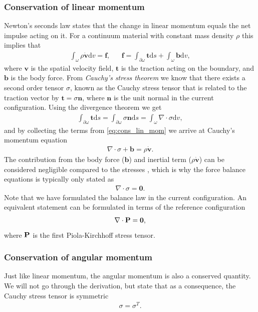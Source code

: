 \subsubsection{Conservation of linear momentum}
Newton's seconds law states that the change in linear momentum equals
the net impulse acting on it. For a continuum material with constant
mass density $\rho$ this implies that
\begin{align}
  \int_{\omega} \rho \dot{\mathbf{v}} \mathrm{d}v = \mathbf{f},
  && \mathbf{f} = \int_{\partial \omega} \mathbf{t} \mathrm{d}s
     + \int_{\omega} \mathbf{b} \mathrm{d}v,
     \label{eq:cons_lin_mom}
\end{align}
where $\mathbf{v}$ is the spatial velocity field, $\mathbf{t}$ is
the traction acting on the boundary, and $\mathbf{b}$ is the body
force. From \emph{Cauchy's stress theorem} we know that there exists a
second order tensor $\sigma$, known as the Cauchy stress tensor that is
related to the traction vector by $\mathbf{t} = \sigma \mathbf{n}$,
where $\mathbf{n}$ is the unit normal in the current configuration.
Using the divergence theorem we get
\begin{align*}
  \int_{\partial \omega} \mathbf{t} \mathrm{d}s
  = \int_{\partial \omega} \sigma \mathbf{n} \mathrm{d}s
  = \int_{\omega} \nabla \cdot \sigma \mathrm{d}v,
\end{align*}
and by collecting the terms from \eqref{eq:cons_lin_mom} we arrive at
Cauchy's momentum equation
\begin{align}
  \nabla \cdot \sigma + \mathbf{b} =  \rho \dot{\mathbf{v}}.
  \label{eq:chauch_momentum_eq}
\end{align}
The contribution from the body force ($\mathbf{b}$)  and inertial term
($\rho \dot{\mathbf{v}}$) can be considered negligible compared to the stresses
\cite{hunter1996kd,tallarida1970left, moskowitz1981effects}, which is
why the force balance equations is typically only stated as
\begin{align}
  \nabla \cdot \sigma = \mathbf{0}.
  \label{eq:momentum_simple_current}
\end{align}
Note that we have formulated the balance law in the current
configuration. An equivalent statement can be formulated in terms of
the reference configuration
\begin{align}
  \nabla \cdot \mathbf{P} = \mathbf{0}, 
  \label{eq:momentum_simple_reference}
\end{align}
where $\mathbf{P}$ is the first Piola-Kirchhoff stress tensor.

\subsubsection{Conservation of angular momentum}
Just like linear momentum, the angular momentum is also a conserved
quantity. We will not go through the derivation, but state that as a
consequence, the Cauchy stress tensor is symmetric
\begin{align}
  \sigma = \sigma^T.
\end{align}



